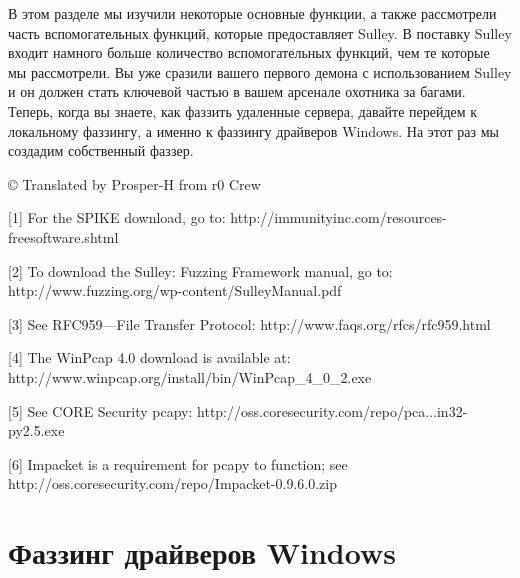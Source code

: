 \documentclass[12pt]{book}
\begin{document}

В этом разделе мы изучили некоторые основные функции, а также рассмотрели часть вспомогательных функций, которые предоставляет Sulley. В поставку Sulley входит намного больше количество вспомогательных функций, чем те которые мы рассмотрели. Вы уже сразили вашего первого демона с использованием Sulley и он должен стать ключевой частью в вашем арсенале охотника за багами. Теперь, когда вы знаете, как фаззить удаленные сервера, давайте перейдем к локальному фаззингу, а именно к фаззингу драйверов Windows. На этот раз мы создадим собственный фаззер. 


© Translated by Prosper-H from r0 Crew


[1] For the SPIKE download, go to:
http://immunityinc.com/resources-freesoftware.shtml

[2] To download the Sulley: Fuzzing Framework manual, go to: http://www.fuzzing.org/wp-content/SulleyManual.pdf

[3] See RFC959—File Transfer Protocol: 
http://www.faqs.org/rfcs/rfc959.html

[4] The WinPcap 4.0 download is available at: http://www.winpcap.org/install/bin/WinPcap\_4\_0\_2.exe

[5] See CORE Security pcapy:
http://oss.coresecurity.com/repo/pca...in32-py2.5.exe

[6] Impacket is a requirement for pcapy to function; see http://oss.coresecurity.com/repo/Impacket-0.9.6.0.zip

\chapter{Фаззинг драйверов Windows}
\end{document}

